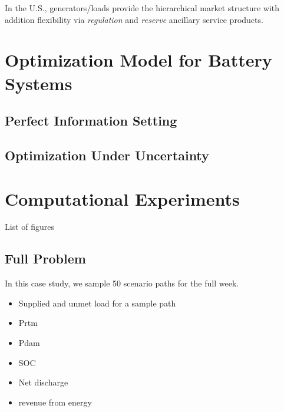 \documentclass[11pt,twoside]{article}
\begin{document}
In the U.S., generators/loads provide the hierarchical market structure with addition flexibility via \emph{regulation} and \emph{reserve} ancillary service products. 

\section{Optimization Model for Battery Systems}\label{sec:model}
\subsection{Perfect Information Setting}
\subsection{Optimization Under Uncertainty}

\section{Computational Experiments}\label{sec:exp}
List of figures

\subsection{Full Problem}
In this case study, we sample 50 scenario paths for the full week.  
\begin{itemize}
\item Supplied and unmet load for a sample path
\item Prtm
\item Pdam
\item SOC 
\item Net discharge
\item revenue from energy
\end{itemize}
\end{document}
